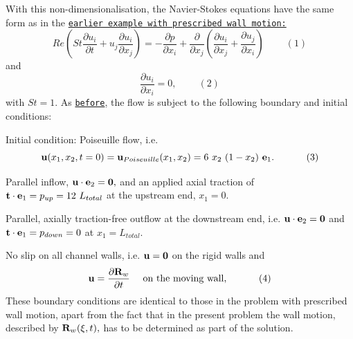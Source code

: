 \begin{center}
\begin{longtabu}
With this non-\/dimensionalisation, the Navier-\/\+Stokes equations have the same form as in the \href{../../../navier_stokes/collapsible_channel/html/index.html}{\tt earlier example with prescribed wall motion\+:} \[ Re\left(St\frac{\partial u_i}{\partial t} + u_j\frac{\partial u_i}{\partial x_j}\right) = - \frac{\partial p}{\partial x_i} + \frac{\partial }{\partial x_j} \left( \frac{\partial u_i}{\partial x_j} + \frac{\partial u_j}{\partial x_i} \right) \ \ \ \ \ \ \ \ \ \ (1) \] and \[ \frac{\partial u_i}{\partial x_i} = 0, \ \ \ \ \ \ \ \ \ \ (2) \] with $ St=1 $. As \href{../../../navier_stokes/collapsible_channel/html/index.html}{\tt before}, the flow is subject to the following boundary and initial conditions\+:
\begin{DoxyItemize}
\item Initial condition\+: Poiseuille flow, i.\+e. \[ {\bf u}(x_1,x_2,t=0) = {\bf u}_{Poiseuille}(x_1,x_2) = 6 \ x_2 \ (1-x_2) \ {\bf e}_1. \ \ \ \ \ \ \ \ \ \ (3) \]
\item Parallel inflow, $ {\bf u} \cdot {\bf e}_2 = {\bf 0}, $ and an applied axial traction of $ {\bf t} \cdot {\bf e}_1 = p_{up} = 12 \ L_{total} $ at the upstream end, $ x_1=0$.
\item Parallel, axially traction-\/free outflow at the downstream end, i.\+e. $ {\bf u} \cdot {\bf e}_2 = {\bf 0} $ and $ {\bf t} \cdot {\bf e}_1 = p_{down} = 0 $ at $ x_1=L_{total}. $
\item No slip on all channel walls, i.\+e. $ {\bf u} = {\bf 0} $ on the rigid walls and \[ {\bf u} = \frac{\partial {\bf R}_w}{\partial t} \mbox{\ \ \ \ on the moving wall,} \ \ \ \ \ \ \ \ \ \ (4) \] These boundary conditions are identical to those in the problem with prescribed wall motion, apart from the fact that in the present problem the wall motion, described by $ {\bf R}_w(\xi, t), $ has to be determined as part of the solution.
\end{DoxyItemize}


\end{longtabu}
\end{center}

